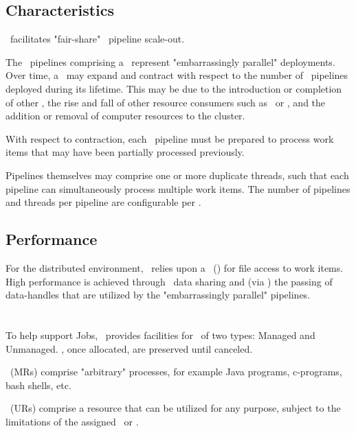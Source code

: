     \subsection{Characteristics}   
    
    \varDUCC~facilitates "fair-share" \varUIMA~pipeline scale-out.
    
    The \varUIMA~pipelines comprising a \varJob~represent "embarrassingly parallel" 
    deployments. Over time, a \varJob~may expand and contract with respect to the number of 
    \varUIMA~pipelines deployed during its lifetime. This may be due to the introduction 
    or completion of other \varJobs, the rise and fall of other resource consumers such 
    as \varReservations~or \varServices, and the addition or removal of computer resources 
    to the cluster.
    
    With respect to contraction, each \varUIMA~pipeline must be prepared to
    process work items that may have been partially processed previously.
   
    Pipelines themselves may comprise one or more duplicate threads, such that each
    pipeline can simultaneously process multiple work items.
    The number of pipelines and threads per pipeline are configurable per \varJob.
   
    \subsection{Performance}  
    
    For the distributed environment, \varDUCC~relies upon a \varNetworkFileSystem~(\varNFS)
    for file access to work items.
    High performance is achieved through \varNFS~data sharing and (via \varActiveMQ) the passing of
    data-handles that are utilized by the "embarrassingly parallel" pipelines.
    
    \section{\varReservations}
    
    To help support Jobs, \varDUCC~provides facilities for \varReservations~of two types: 
    Managed and Unmanaged. \varReservations, once allocated, are preserved until 
    canceled. 
    
    \varManagedReservations~(MRs) comprise "arbitrary" processes, for example Java
    programs, c-programs, bash shells, etc.
    
    \varUnmanagedReservations~(URs) comprise a resource that can be utilized for any 
    purpose, subject to the limitations of the assigned \varShare~or \varShares.
            
